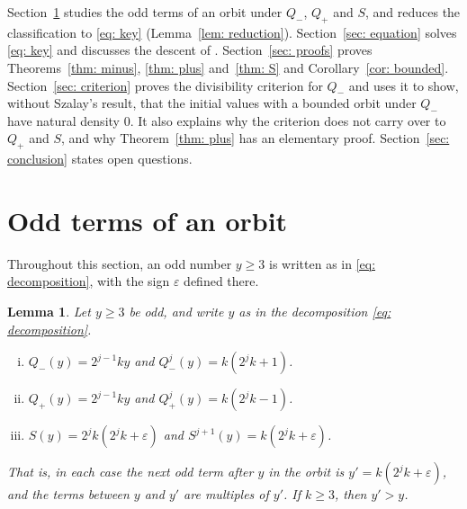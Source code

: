 \documentclass{article}
\newtheorem{lemma}{Lemma}
\newcommand{\Ge}{\geqslant}
\begin{document}
Section~\ref{sec: odd terms} studies the odd terms of an orbit under $Q_-$, $Q_+$ and $S$, and reduces the classification to \eqref{eq: key} (Lemma~\ref{lem: reduction}). Section~\ref{sec: equation} solves \eqref{eq: key} and discusses the descent of \citep{sedaghat2020dual}. Section~\ref{sec: proofs} proves Theorems~\ref{thm: minus}, \ref{thm: plus} and~\ref{thm: S} and Corollary~\ref{cor: bounded}. Section~\ref{sec: criterion} proves the divisibility criterion for $Q_-$ and uses it to show, without Szalay's result, that the initial values with a bounded orbit under $Q_-$ have natural density $0$. It also explains why the criterion does not carry over to $Q_+$ and $S$, and why Theorem~\ref{thm: plus} has an elementary proof. Section~\ref{sec: conclusion} states open questions.

\section{Odd terms of an orbit}
\label{sec: odd terms}

Throughout this section, an odd number $y \Ge 3$ is written as in \eqref{eq: decomposition}, with the sign $\varepsilon$ defined there.

\begin{lemma}
\label{lem: odd step}
    Let $y \Ge 3$ be odd, and write $y$ as in the decomposition \eqref{eq: decomposition}.
    \begin{enumerate}[(i)]
        \setlength{\itemsep}{0pt}
        \item $Q_-(y) = 2^{j-1} k y$ and $Q_-^j(y) = k (2^j k + 1)$.
        \item $Q_+(y) = 2^{j-1} k y$ and $Q_+^j(y) = k (2^j k - 1)$.
        \item $S(y) = 2^j k (2^j k + \varepsilon)$ and $S^{j+1}(y) = k (2^j k + \varepsilon)$.
    \end{enumerate}
    That is, in each case the next odd term after $y$ in the orbit is $y' = k (2^j k + \varepsilon)$, and the terms between $y$ and $y'$ are multiples of $y'$. If $k \Ge 3$, then $y' > y$.
\end{lemma}
\end{document}
